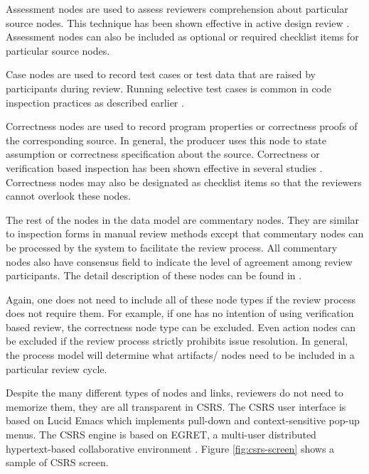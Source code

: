 Assessment nodes are used to assess reviewers comprehension about
particular source nodes. This technique has been shown effective in
active design review \cite{Parnas85}. Assessment nodes can also be
included as optional or required checklist items for particular source
nodes.

Case nodes are used to record test cases or test data that are raised
by participants during review. Running selective test cases is common
in code inspection practices as described earlier
\cite{Dunn84,Ackerman89}.

Correctness nodes are used to record program properties or correctness
proofs of the corresponding source.  In general, the producer uses
this node to state assumption or correctness specification about the
source.  Correctness or verification based inspection has been shown
effective in several studies \cite{Dyer90,Basili85}.  Correctness
nodes may also be designated as checklist items so that the reviewers
cannot overlook these nodes.

The rest of the nodes in the data model are commentary nodes. They are
similar to inspection forms in manual review methods except that
commentary nodes can be processed by the system to facilitate the
review process.  All commentary nodes also have consensus field to
indicate the level of agreement among review participants.  The detail
description of these nodes can be found in \cite{Johnson93}.

Again, one does not need to include all of these node types if the
review process does not require them. For example, if one has no
intention of using verification based review, the correctness node
type can be excluded. Even action nodes can be excluded if the review
process strictly prohibits issue resolution.  In general, the process
model will determine what artifacts/ nodes need to be included in a
particular review cycle.

Despite the many different types of nodes and links, reviewers do not
need to memorize them, they are all transparent in CSRS.  The CSRS
user interface is based on Lucid Emacs which implements pull-down and
context-sensitive pop-up menus.  The CSRS engine is based on EGRET, a
multi-user distributed hypertext-based collaborative environment
\cite{Johnson92}. Figure \ref{fig:csrs-screen} shows a sample of CSRS
screen.

\begin{figure*}[tb]
  {\centerline{}}
  \caption{CSRS Screen}
  \label{fig:csrs-screen}
\end{figure*}



